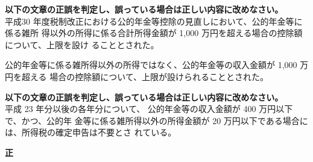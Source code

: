 \begin{truefalse}[年金1 2018 問題2(3)\textcircled{4}]
       \textbf{以下の文章の正誤を判定し、誤っている場合は正しい内容に改めなさい。}
\\  

  平成30 年度税制改正における公的年金等控除の見直しにおいて、公的年金等に係る雑所
得以外の所得に係る合計所得金額が 1,000 万円を超える場合の控除額について、上限を設け
ることとされた。
\end{truefalse}

\begin{answerbox}
 公的年金等に係る雑所得以外の所得ではなく、公的年金等の収入金額が 1,000 万円を超える
場合の控除額について、上限が設けられることとされた。
\end{answerbox}

\begin{truefalse}[年金1 H29 問題2(3)\textcircled{3}]
         \textbf{以下の文章の正誤を判定し、誤っている場合は正しい内容に改めなさい。}
\\  

  平成 23 年分以後の各年分について、 公的年金等の収入金額が 400 万円以下で、かつ、公的年
金等に係る雑所得以外の所得金額が 20 万円以下である場合には、所得税の確定申告は不要とさ
れている。
\end{truefalse}

\begin{answerbox}
  \textbf{正}
\end{answerbox}

\newpage